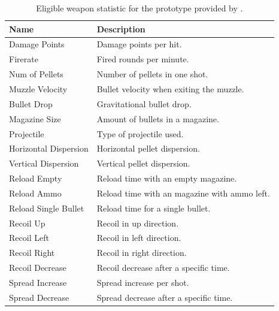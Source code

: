 \documentclass[MGS,Master,english]{twbook}%
\begin{document}
\begin{table}[!htbp]
	\centering
	\begin{tabular}{|l|l|}
		\hline
		\textbf{Name}         & \textbf{Description}                         \\ \hline\hline
		Damage Points         & Damage points per hit.                       \\ \hline
		Firerate              & Fired rounds per minute.                     \\ \hline
		Num of Pellets        & Number of pellets in one shot.               \\ \hline
		Muzzle Velocity       & Bullet velocity when exiting the muzzle.     \\ \hline
		Bullet Drop           & Gravitational bullet drop.                   \\ \hline
		Magazine Size         & Amount of bullets in a magazine.             \\ \hline
		Projectile            & Type of projectile used.                     \\ \hline
		Horizontal Dispersion & Horizontal pellet dispersion.                \\ \hline
		Vertical Dispersion   & Vertical pellet dispersion.                  \\ \hline
		Reload Empty          & Reload time with an empty magazine.          \\ \hline
		Reload Ammo           & Reload time with an magazine with ammo left. \\ \hline
		Reload Single Bullet  & Reload time for a single bullet.             \\ \hline
		Recoil Up             & Recoil in up direction.                      \\ \hline
		Recoil Left           & Recoil in left direction.                    \\ \hline
		Recoil Right          & Recoil in right direction.                   \\ \hline
		Recoil Decrease       & Recoil decrease after a specific time.       \\ \hline
		Spread Increase       & Spread increase per shot.                    \\ \hline
		Spread Decrease       & Spread decrease after a specific time.       \\ \hline
	\end{tabular}
	\caption{Eligible weapon statistic for the prototype provided by \protect\cite{symthic::bf1stats}.}
	\label{battlefield::weaponStats}
\end{table}
\end{document}
